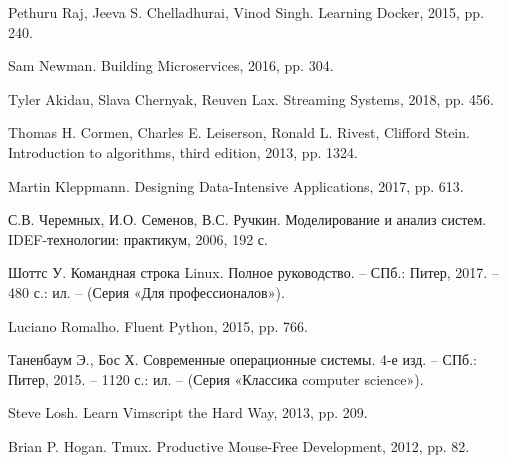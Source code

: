 \nocite{*}

\begin{thebibliography}{9}
     Pethuru Raj, Jeeva S. Chelladhurai, Vinod Singh.
        Learning Docker, 2015, pp. 240.

     Sam Newman. Building Microservices, 2016, pp. 304.

     Tyler Akidau, Slava Chernyak, Reuven Lax.
        Streaming Systems, 2018, pp. 456.

     Thomas H. Cormen, Charles E. Leiserson, Ronald L.
        Rivest, Clifford Stein. Introduction to algorithms, third edition,
        2013, pp. 1324.

     Martin Kleppmann. Designing Data-Intensive
        Applications, 2017, pp. 613.

     С.В. Черемных, И.О. Семенов, В.С. Ручкин.
        Моделирование и анализ систем. IDEF-технологии: практикум, 2006, 192 с.

     Шоттс У. Командная строка Linux. Полное
        руководство. -- СПб.: Питер, 2017. -- 480 с.: ил. -- (Серия «Для
        профессионалов»).

     Luciano Romalho. Fluent Python, 2015, pp. 766.

     Таненбаум Э., Бос Х. Современные операционные системы.
        4-е изд. -- СПб.: Питер, 2015. -- 1120 с.: ил. -- (Серия «Классика
        computer science»).

     Steve Losh. Learn Vimscript the Hard Way, 2013,
        pp. 209.

    Brian P. Hogan. Tmux. Productive Mouse-Free Development,
        2012, pp. 82.
\end{thebibliography}
